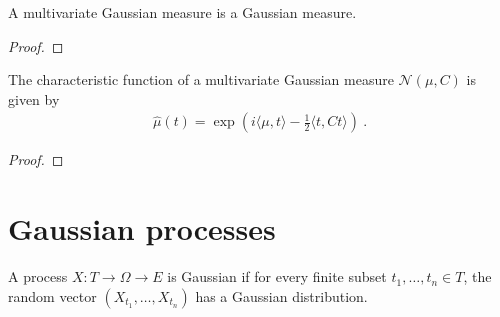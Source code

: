 \begin{lemma}\label{lem:isGaussian_multivariateGaussian}
A multivariate Gaussian measure is a Gaussian measure.
\end{lemma}

\begin{proof}

\end{proof}


\begin{theorem}\label{thm:charFun_multivariateGaussian}
The characteristic function of a multivariate Gaussian measure $\mathcal{N}(\mu, C)$ is given by
\begin{align*}
  \hat{\mu}(t) = \exp\left(i \langle \mu, t \rangle - \frac{1}{2} \langle t, C t \rangle\right)
  \: .
\end{align*}
\end{theorem}

\begin{proof}

\end{proof}


\section{Gaussian processes}
\label{sec:gaussian_processes}

\begin{definition}\label{def:IsGaussianProcess}
A process $X : T \to \Omega \to E$ is Gaussian if for every finite subset $t_1, \ldots, t_n \in T$, the random vector $(X_{t_1}, \ldots, X_{t_n})$ has a Gaussian distribution.
\end{definition}
